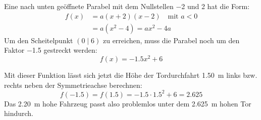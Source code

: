 \begin{exercise}
\begin{minipage}{3.5cm}
\begin{tikzpicture}[scale=0.5]
      \end{tikzpicture}
    \end{minipage}%
    \hspace*{\fill}%
    \begin{minipage}{11cm}
      Eine nach unten geöffnete Parabel mit dem
      Nullstellen \num{-2} und \num{2} hat die Form:
      \begin{equation*}
        \begin{split}
          f(x)&=a(x+2)(x-2)\quad\text{mit $a<0$}\\
              &=a(x^2-4)
               =ax^2-4a
        \end{split}
      \end{equation*}
      Um den Scheitelpunkt $(0\mid6)$ zu erreichen,
       muss die Parabel noch um den Faktor \num{-1.5}
      gestreckt werden:
      \begin{equation*}
        f(x)=-\num{1.5}x^2+6
      \end{equation*}
    \end{minipage}\bigskip\par
    Mit dieser Funktion lässt sich jetzt die Höhe
    der Tordurchfahrt \SI{1.50}{\metre} links bzw.
    rechts neben der Symmetrieachse berechnen:
    \begin{equation*}
      f(\num{-1.5})=f(\num{1.5})
      =\num{-1.5}\cdot\num{1.5}^2+6
      =\num{2.625}
    \end{equation*}
    Das \SI{2.20}{\metre} hohe Fahrzeug passt also
    problemlos unter dem \SI{2.625}{\metre} hohen Tor
    hindurch.
  \fi
\end{exercise}
